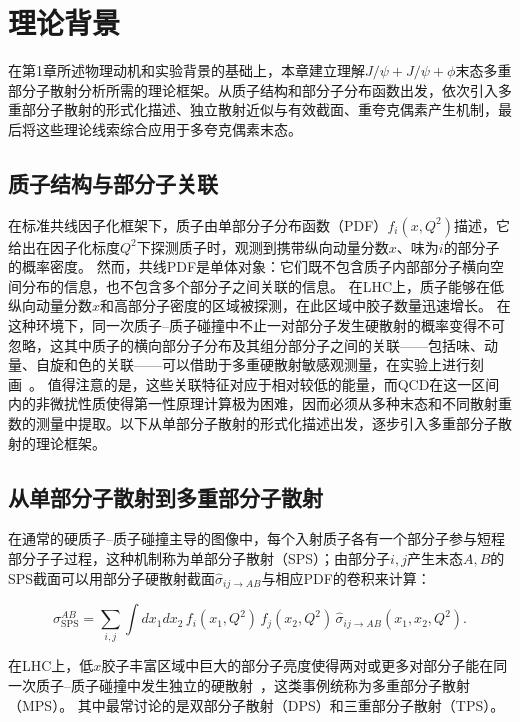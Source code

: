\chapter{理论背景}
\label{chap:theory}

在第1章所述物理动机和实验背景的基础上，本章建立理解$J/\psi+J/\psi+\phi$末态多重部分子散射分析所需的理论框架。从质子结构和部分子分布函数出发，依次引入多重部分子散射的形式化描述、独立散射近似与有效截面、重夸克偶素产生机制，最后将这些理论线索综合应用于多夸克偶素末态。

\section{质子结构与部分子关联}

在标准共线因子化框架下，质子由单部分子分布函数（PDF）$f_i(x,Q^2)$描述，它给出在因子化标度$Q^2$下探测质子时，观测到携带纵向动量分数$x$、味为$i$的部分子的概率密度。
然而，共线PDF是单体对象：它们既不包含质子内部部分子横向空间分布的信息，也不包含多个部分子之间关联的信息。
在LHC上，质子能够在低纵向动量分数$x$和高部分子密度的区域被探测，在此区域中胶子数量迅速增长。
在这种环境下，同一次质子--质子碰撞中不止一对部分子发生硬散射的概率变得不可忽略，这其中质子的横向部分子分布及其组分部分子之间的关联——包括味、动量、自旋和色的关联——可以借助于多重硬散射敏感观测量，在实验上进行刻画~\cite{Z48W3VLV,Diehl:2018:DPS-theory}。
值得注意的是，这些关联特征对应于相对较低的能量，而QCD在这一区间内的非微扰性质使得第一性原理计算极为困难，因而必须从多种末态和不同散射重数的测量中提取。以下从单部分子散射的形式化描述出发，逐步引入多重部分子散射的理论框架。

\section{从单部分子散射到多重部分子散射}


在通常的硬质子--质子碰撞主导的图像中，每个入射质子各有一个部分子参与短程部分子子过程，这种机制称为单部分子散射（SPS）；由部分子$i,j$产生末态$A,B$的SPS截面可以用部分子硬散射截面$\hat{\sigma}_{ij \to AB}$与相应PDF的卷积来计算：

\begin{equation}
  \label{eq:sps-xsec}
  \sigma_\mathrm{SPS}^{AB} = \sum_{i,j} \int dx_1 dx_2 \, f_i(x_1, Q^2) \, f_j(x_2, Q^2) \, \hat{\sigma}_{ij \to AB}(x_1, x_2, Q^2) .
\end{equation}

在LHC上，低$x$胶子丰富区域中巨大的部分子亮度使得两对或更多对部分子能在同一次质子--质子碰撞中发生独立的硬散射~\cite{Z48W3VLV,denterriaDoubleTripleNparton2017}，这类事例统称为多重部分子散射（MPS）。
其中最常讨论的是双部分子散射（DPS）和三重部分子散射（TPS）。

